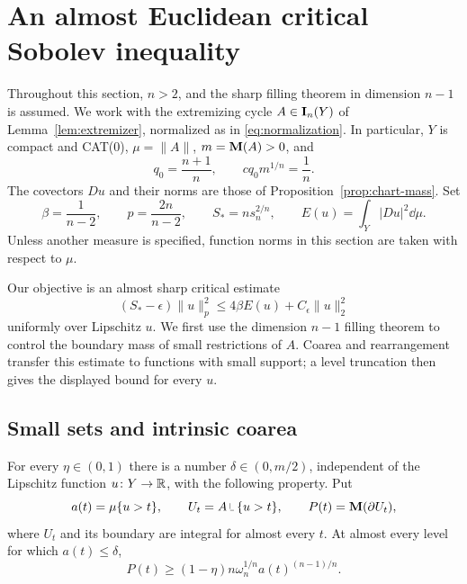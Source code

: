 \section{An almost Euclidean critical Sobolev inequality}
\label{sec:sobolev}

Throughout this section, $n>2$, and the sharp filling theorem in dimension
$n-1$ is assumed.  We work with the extremizing cycle $A\in\mathbf I_n(Y)$ of
Lemma~\ref{lem:extremizer}, normalized as in
\eqref{eq:normalization}.  In particular, $Y$ is compact and CAT(0),
$\mu=\|A\|$, $m=\mathbf M(A)>0$, and
\[
 q_0=\frac{n+1}{n},\qquad cq_0m^{1/n}=\frac1n.
\]
The covectors $Du$ and their norms are those of
Proposition~\ref{prop:chart-mass}.  Set
\begin{equation}
 \beta=\frac1{n-2},\qquad p=\frac{2n}{n-2},\qquad
 S_*=ns_n^{2/n},\qquad
 E(u)=\int_Y|Du|^2\dd\mu.
 \label{eq:sobolev-notation}
\end{equation}
Unless another measure is specified, function norms in this section are
taken with respect to $\mu$.

Our objective is an almost sharp critical estimate
\[
 (S_*-\epsilon)\|u\|_p^2
 \le4\beta E(u)+C_\epsilon\|u\|_2^2
\]
uniformly over Lipschitz $u$. We first use the dimension $n-1$ filling
theorem to control the boundary mass of small restrictions of $A$.
Coarea and rearrangement transfer this estimate to functions with small
support; a level truncation then gives the displayed bound for every $u$.

\subsection{Small sets and intrinsic coarea}

\begin{proposition}
\label{prop:small-set}
For every $\eta\in(0,1)$ there is a number $\delta\in(0,m/2)$, independent
of the Lipschitz function $u\colon Y\to\mathbb R$, with the following property.
Put
\[
 a(t)=\mu\{u>t\},\qquad
 U_t=A\restr\{u>t\},\qquad P(t)=\M(\partial U_t),
\]
where $U_t$ and its boundary are integral for almost every $t$.
At almost every level for which $a(t)\le\delta$,
\begin{equation}
 P(t)\ge(1-\eta)n\omega_n^{1/n}a(t)^{(n-1)/n}.
 \label{eq:small-set}
\end{equation}
\end{proposition}

